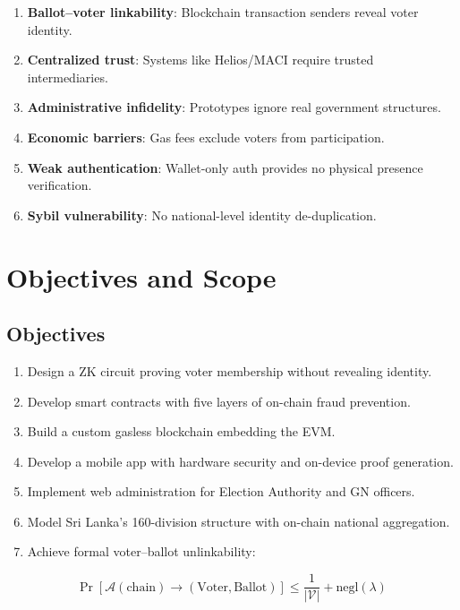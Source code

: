 \begin{enumerate}
    \item \textbf{Ballot--voter linkability}: Blockchain transaction senders reveal voter identity.
    \item \textbf{Centralized trust}: Systems like Helios/MACI require trusted intermediaries.
    \item \textbf{Administrative infidelity}: Prototypes ignore real government structures.
    \item \textbf{Economic barriers}: Gas fees exclude voters from participation.
    \item \textbf{Weak authentication}: Wallet-only auth provides no physical presence verification.
    \item \textbf{Sybil vulnerability}: No national-level identity de-duplication.
\end{enumerate}

\section{Objectives and Scope}

\subsection{Objectives}
\begin{enumerate}
    \item Design a ZK circuit proving voter membership without revealing identity.
    \item Develop smart contracts with five layers of on-chain fraud prevention.
    \item Build a custom gasless blockchain embedding the EVM.
    \item Develop a mobile app with hardware security and on-device proof generation.
    \item Implement web administration for Election Authority and GN officers.
    \item Model Sri Lanka's 160-division structure with on-chain national aggregation.
    \item Achieve formal voter--ballot unlinkability:
\end{enumerate}

\begin{equation}
\Pr\left[\mathcal{A}(\text{chain}) \to (\text{Voter}, \text{Ballot})\right] \le \frac{1}{|\mathcal{V}|} + \text{negl}(\lambda)
\label{eq:anon-intro}
\end{equation}

